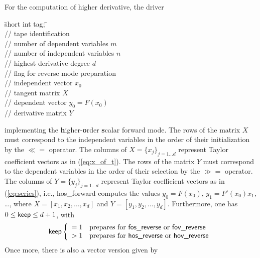 \documentclass[11pt,twoside]{article}
\begin{document}
For the computation of higher derivative, the driver
\begin{tabbing}
\hspace{0.5in}\={\sf short int tag;} \hspace{1.1in}\= \kill    %
\\
         \> // tape identification \\
                 \> // number of  dependent variables $m$\\
                 \> // number of independent variables $n$\\
                 \> // highest derivative degree $d$\\
              \> // flag for reverse mode preparation\\
          \> // independent vector $x_0$\\
        \> // tangent matrix $X$\\
          \> // dependent vector $y_0=F(x_0)$\\
        \> // derivative matrix $Y$
\end{tabbing}
implementing the  {\bf h}igher-{\bf o}rder {\bf s}calar forward mode.
The rows of the matrix $X$ must correspond to the independent variables in the order of their 
initialization by the \boldmath $\ll=$ \unboldmath operator. The columns of 
$X = \{x_j\}_{j=1\ldots d}$ represent Taylor coefficient vectors as in 
(\ref{eq:x_of_t}). The rows of the matrix $Y$ must correspond to the
dependent variables in the order of their selection by the \boldmath $\gg=$ \unboldmath operator.
The columns of $Y = \{y_j\}_{j=1\ldots d}$ represent 
Taylor coefficient vectors as in (\ref{eq:series}), i.e., {\sf hos\_forward}
computes the values
$y_0=F(x_0)$, $y_1=F'(x_0)x_1$, \ldots, where 
$X=[x_1,x_2,\ldots,x_d]$ and  $Y=[y_1,y_2,\ldots,y_d]$. Furthermore, one has
$0\leq\text{\sf keep}\leq d+1$, with
\begin{align*}
\text{\sf keep}  \left\{\begin{array}{cl}
       = 1 & \text{prepares for {\sf fos\_reverse} or {\sf fov\_reverse}} \\
       > 1 & \text{prepares for {\sf hos\_reverse} or {\sf hov\_reverse}}
       \end{array}\right.
\end{align*}
Once more, there is also a vector version given by
\end{document}
